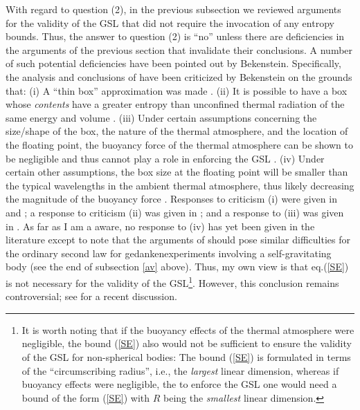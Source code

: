 \documentclass[12pt]{article}
\begin{document}
With regard to question (2), in the previous subsection we reviewed
arguments for the validity of the GSL that did not require the
invocation of any entropy bounds. Thus, the answer to question (2) is
``no'' unless there are deficiencies in the arguments of the previous
section that invalidate their conclusions. A number of such potential
deficiencies have been pointed out by Bekenstein. Specifically, the
analysis and conclusions of \cite{uw} have been criticized by
Bekenstein on the grounds that: (i) A ``thin box'' approximation was
made \cite{b5}. (ii) It is possible to have a box whose {\it contents}
have a greater entropy than unconfined thermal radiation of the same
energy and volume \cite{b5}. (iii) Under certain assumptions
concerning the size/shape of the box, the nature of the thermal
atmosphere, and the location of the floating point, the buoyancy force
of the thermal atmosphere can be shown to be negligible and thus
cannot play a role in enforcing the GSL \cite{b6}. (iv) Under certain
other assumptions, the box size at the floating point will be smaller
than the typical wavelengths in the ambient thermal atmosphere, thus
likely decreasing the magnitude of the buoyancy force \cite{b7}.
Responses to criticism (i) were given in \cite{uw2} and \cite{pw}; a
response to criticism (ii) was given in \cite{uw2}; and
a response to (iii) was given in \cite{pw}. As far as I am a aware, no
response to (iv) has yet been given in the literature except to note
\cite{fmw} that the arguments of \cite{b7} should pose similar
difficulties for the ordinary second law for gedankenexperiments
involving a self-gravitating body (see the end of
subsection \ref{av} above). Thus, my own view is that eq.(\ref{SE})
is not necessary for the validity of the GSL\footnote{It is worth
noting that if the buoyancy effects of the thermal atmosphere were
negligible, the bound (\ref{SE}) also would not be sufficient to
ensure the validity of the GSL for non-spherical bodies: The bound
(\ref{SE}) is formulated in terms of the ``circumscribing radius'',
i.e., the {\it largest} linear dimension, whereas if buoyancy effects
were negligible, the to enforce the GSL one would need a bound of the
form (\ref{SE}) with $R$ being the {\it smallest} linear
dimension.}. However, this conclusion remains controversial; see
\cite{and} for a recent discussion.
\end{document}
